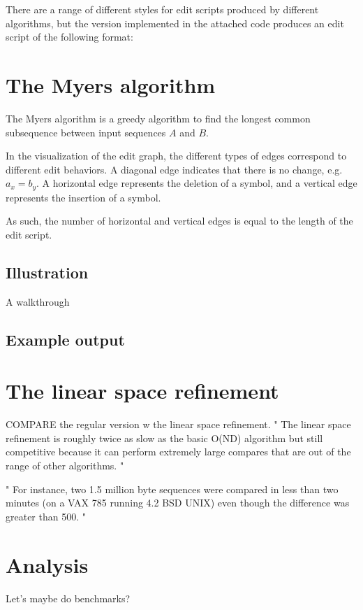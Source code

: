 \documentclass[11pt,letterpaper]{article}
\begin{document}
There are a range of different styles for edit scripts produced by different \diff algorithms, but the version implemented in the attached code produces an edit script of the following format:



\section{The Myers algorithm}

The Myers algorithm is a greedy algorithm to find the longest common subsequence between input sequences $A$ and $B$.

In the visualization of the edit graph, the different types of edges correspond to different edit behaviors. A diagonal edge indicates that there is no change, e.g. $a_x = b_y$. A horizontal edge represents the deletion of a symbol, and a vertical edge represents the insertion of a symbol. 

As such, the number of horizontal and vertical edges is equal to the length of the edit script. 



\subsection{Illustration}
A walkthrough

\subsection{Example output}

\section{The linear space refinement}

COMPARE the regular version w the linear space refinement. 
" The linear space refinement is roughly twice as slow as the
basic O(ND) algorithm but still competitive because it can perform extremely
large compares that are out of the range of other algorithms. "

" For instance, two
1.5 million byte sequences were compared in less than two minutes (on a VAX
785 running 4.2 BSD UNIX) even though the difference was greater than 500. "


\section{Analysis}

Let's maybe do benchmarks?



\balance
\end{document}
